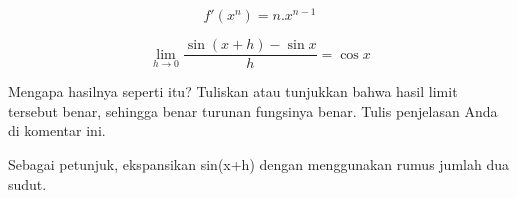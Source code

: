 \documentclass[12pt,arial,letterpaper]{book}
\begin{document}
\begin{eulernootebook}
\begin{eulercomment}
\begin{eulercomment}
\begin{eulernootebook}
\begin{eulercomment}
\begin{eulercomment}
\begin{eulercomment}
\begin{eulercomment}
\begin{eulercomment}
\begin{eulercomment}
\begin{eulernotebook}
\begin{eulercomment}
\begin{eulercomment}
\begin{eulercomment}
\begin{eulercomment}
\begin{eulercomment}
\begin{eulercomment}
\begin{eulerformula}
\[
f'(x^n) = n.x^{n-1}
\]
\end{eulerformula}
\eulersubheading{}
\begin{eulerformula}
\[
\lim_{h\rightarrow 0}{\frac{\sin \left(x+h\right)-\sin x}{h}}=\cos 
 x
\]
\end{eulerformula}
\begin{eulercomment}
Mengapa hasilnya seperti itu? Tuliskan atau tunjukkan bahwa hasil
limit tersebut benar, sehingga benar turunan fungsinya benar. Tulis
penjelasan Anda di komentar ini. 

Sebagai petunjuk, ekspansikan sin(x+h) dengan menggunakan rumus jumlah
dua sudut.


\end{eulercomment}
\end{eulercomment}
\end{eulercomment}
\end{eulercomment}
\end{eulercomment}
\end{eulercomment}
\end{eulercomment}
\end{eulernotebook}
\end{eulercomment}
\end{eulercomment}
\end{eulercomment}
\end{eulercomment}
\end{eulercomment}
\end{eulercomment}
\end{eulernootebook}
\end{eulercomment}
\end{eulercomment}
\end{eulernootebook}
\end{document}
